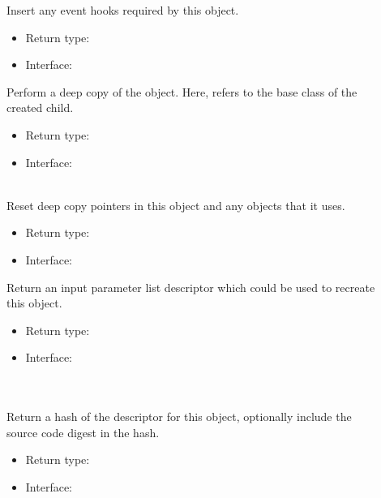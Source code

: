 \begin{description}
  
\item[] Insert any event hooks required by this object. 
\begin{itemize}
\item Return type: 
\item Interface: \mono{()}\\
\end{itemize}

\item[]  Perform a deep copy of the object. Here,  refers to the base class of the created  child.
\begin{itemize}
\item Return type: 
\item Interface: \\
  \\
\end{itemize}

\item[] Reset deep copy pointers in this object and any objects that it uses.
\begin{itemize}
\item Return type: 
\item Interface: \mono{()}\\
\end{itemize}

\item[] Return an input parameter list descriptor which could be used to recreate this object.
\begin{itemize}
\item Return type: 
\item Interface: \\
  \\
  \\
\end{itemize}

\item[] Return a hash of the descriptor for this object, optionally include the source code digest in the hash.
\begin{itemize}
\item Return type: 
\item Interface: \\
  \\
\end{itemize}


\end{description}
